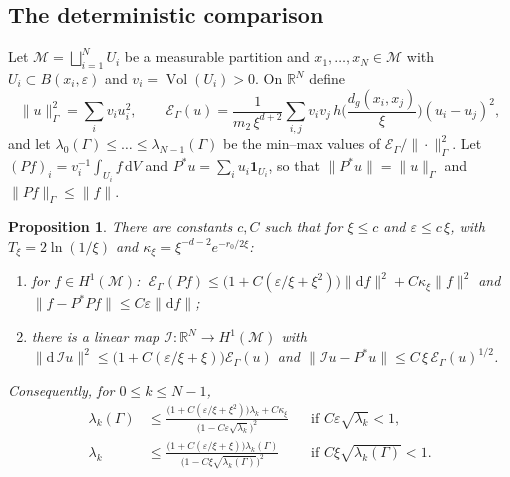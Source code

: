 \documentclass[11pt,a4paper]{article}
\theoremstyle{stmt}
\newtheorem{proposition}[theorem]{Proposition}
\theoremstyle{defn}
\theoremstyle{rmk}
\numberwithin{equation}{section}
\DeclareMathOperator{\Vol}{Vol}
\newcommand{\M}{\mathcal{M}}
\newcommand{\R}{\mathbb{R}}
\newcommand{\dd}{\mathrm{d}}
\begin{document}
\subsection{The deterministic comparison}

Let $\M=\bigsqcup_{i=1}^NU_i$ be a measurable partition and $x_1,\dots,x_N\in\M$ with $U_i\subset B(x_i,\varepsilon)$ and $v_i=\Vol(U_i)>0$. On $\R^N$ define
\begin{equation}\label{eq:Gamma}
\|u\|_\Gamma^2=\sum_iv_iu_i^2,\qquad \mathcal E_\Gamma(u)=\frac{1}{m_2\,\xi^{d+2}}\sum_{i,j}v_iv_j\,h\Big(\frac{d_g(x_i,x_j)}{\xi}\Big)(u_i-u_j)^2 ,
\end{equation}
and let $\lambda_0(\Gamma)\le\dots\le\lambda_{N-1}(\Gamma)$ be the min--max values of $\mathcal E_\Gamma/\|\cdot\|_\Gamma^2$. Let $(Pf)_i=v_i^{-1}\int_{U_i}f\,\dd V$ and $P^*u=\sum_iu_i\mathbf 1_{U_i}$, so that $\|P^*u\|=\|u\|_\Gamma$ and $\|Pf\|_\Gamma\le\|f\|$.

\begin{proposition}\label{prop:det}
There are constants $c,C$ such that for $\xi\le c$ and $\varepsilon\le c\,\xi$, with $T_\xi=2\ln(1/\xi)$ and $\kappa_\xi=\xi^{-d-2}e^{-r_0/2\xi}$:
\begin{enumerate}[label=\textup{(\alph*)}]
\item for $f\in H^1(\M)$: $\ \mathcal E_\Gamma(Pf)\le\big(1+C(\varepsilon/\xi+\xi^2)\big)\|\dd f\|^2+C\kappa_\xi\|f\|^2$ and $\|f-P^*Pf\|\le C\varepsilon\|\dd f\|$;
\item there is a linear map $\mathcal I:\R^N\to H^1(\M)$ with
$\|\dd\,\mathcal Iu\|^2\le\big(1+C(\varepsilon/\xi+\xi)\big)\mathcal E_\Gamma(u)$ and $\|\mathcal Iu-P^*u\|\le C\,\xi\,\mathcal E_\Gamma(u)^{1/2}$.
\end{enumerate}
Consequently, for $0\le k\le N-1$,
\begin{align}
\lambda_k(\Gamma)&\le\frac{\big(1+C(\varepsilon/\xi+\xi^2)\big)\lambda_k+C\kappa_\xi}{\big(1-C\varepsilon\sqrt{\lambda_k}\big)^2}&&\text{if }C\varepsilon\sqrt{\lambda_k}<1,\label{eq:U}\\
\lambda_k&\le\frac{\big(1+C(\varepsilon/\xi+\xi)\big)\lambda_k(\Gamma)}{\big(1-C\xi\sqrt{\lambda_k(\Gamma)}\big)^2}&&\text{if }C\xi\sqrt{\lambda_k(\Gamma)}<1.\label{eq:Lo}
\end{align}
\end{proposition}
\end{document}

